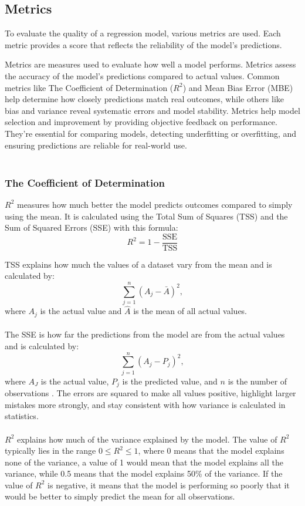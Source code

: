 \subsection{Metrics}
To evaluate the quality of a regression model, various metrics are used. Each metric provides a score that reflects the reliability of the model's predictions. \newline

\noindent Metrics are measures used to evaluate how well a model performs. Metrics assess the accuracy of the model’s predictions compared to actual values. Common metrics like The Coefficient of Determination ($R^{2}$) and Mean Bias Error (MBE) help determine how closely predictions match real outcomes, while others like bias and variance reveal systematic errors and model stability. Metrics help model selection and improvement by providing objective feedback on performance. They’re essential for comparing models, detecting underfitting or overfitting, and ensuring predictions are reliable for real-world use.
\\\\

\subsubsection{The Coefficient of Determination}
$R^2$ measures how much better the model predicts outcomes compared to simply using the mean. It is calculated using the Total Sum of Squares (TSS) and the Sum of Squared Errors (SSE) with this formula: 
\begin{equation}
R^2=1-\frac{\text{SSE}}{\text{TSS}}
\end{equation}

\noindent TSS explains how much the values of a dataset vary from the mean and is calculated by: 
\begin{equation}
\sum_{j=1}^{n}(A_j - \bar{A})^2,
\end{equation}
where $A_j$ is the actual value and $\hat{A}$ is the mean of all actual values.
\\\\

\noindent The SSE is how far the predictions from the model are from the actual values and is calculated by:
\begin{equation}
	\sum_{j=1}^{n}(A_j - P_j)^2,
\end{equation}
where $A_J$ is the actual value, $P_j$ is the predicted value, and $n$ is the number of observations \cite{metrics}. The errors are squared to make all values positive, highlight larger mistakes more strongly, and stay consistent with how variance is calculated in statistics.
\\\\
$R^2$ explains how much of the variance explained by the model. The value of $R^2$ typically lies in the range $0 \leq R^2 \leq 1$, where 0 means that the model explains none of the variance, a value of 1 would mean that the model explains all the variance, while 0.5 means that the model explains 50\% of the variance. If the value of $R^2$ is negative, it means that the model is performing so poorly that it would be better to simply predict the mean for all observations.

